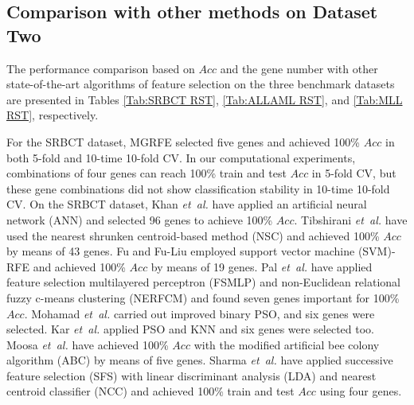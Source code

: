 \documentclass[10pt,journal,compsoc]{IEEEtran}
\begin{document}
	\subsection{Comparison with other methods on Dataset Two}
	
	The performance comparison based on \(Acc\) and the gene number with other state-of-the-art algorithms of feature selection on the three benchmark datasets are presented in Tables \ref{Tab:SRBCT RST}, \ref{Tab:ALLAML RST}, and \ref{Tab:MLL RST}, respectively.
	
	For the SRBCT dataset, MGRFE selected five genes and achieved 100\% $Acc$ in both 5-fold and 10-time 10-fold CV. In our computational experiments, combinations of four genes can reach 100\% train and test $Acc$ in 5-fold CV, but these gene combinations did not show classification stability in 10-time 10-fold CV. On the SRBCT dataset, Khan \emph{et~al.} \cite{P13} have applied an artificial neural network (ANN) and selected 96 genes to achieve 100\% $Acc$. Tibshirani \emph{et~al.} \cite{P20} have used the nearest shrunken centroid-based method (NSC) and achieved 100\% $Acc$ by means of 43 genes. Fu and Fu-Liu \cite{P10} employed support vector machine (SVM)-RFE and achieved 100\% $Acc$ by means of 19 genes. Pal \emph{et~al.} \cite{P17} have applied feature selection multilayered perceptron (FSMLP) and non-Euclidean relational fuzzy c-means clustering (NERFCM) and found seven genes important for 100\% $Acc$. Mohamad \emph{et~al.} \cite{P16} carried out improved binary PSO, and six genes were selected. Kar \emph{et~al.} \cite{W15} applied PSO and KNN and six genes were selected too. Moosa \emph{et~al.} \cite{P32} have achieved 100\% $Acc$ with the modified artificial bee colony algorithm (ABC) by means of five genes. Sharma \emph{et~al.} \cite{P18} have applied successive feature selection (SFS) with linear discriminant analysis (LDA) and nearest centroid classifier (NCC) and achieved 100\% train and test $Acc$ using four genes.
	
\end{document}
